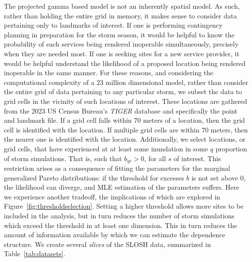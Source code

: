 The projected gamma based model is not an inherently spatial model.  
    As such, rather than holding the entire grid in memory, it makes sense to consider 
    data pertaining only to landmarks of interest.    If one is performing 
    contingency planning in preparation for the storm season, it would be 
    helpful to know the probability of such services being rendered inoperable 
    simultaneously, precisely when they are needed most.  If one is seeking 
    sites for a new service provider, it would be helpful understand the 
    likelihood of a proposed location being rendered inoperable in the same 
    manner.  For these reasons, and considering the computational complexity of 
    a 23 million dimensional model, rather than consider the entire grid of data 
    pertaining to any particular storm, we subset the data to grid cells in the 
    vicinity of such locations of interest.  These locations are gathered from 
    the 2023 US Census Bureau's \emph{TIGER} database \needcite and specifically 
    the point and landmark file.  If a grid cell falls within 70 meters of a location,
    then the grid cell is identified with the location.  If multiple grid cells
    are within 70 meters, then the nearer one is identified with the location.
    Additionally, we select locations, or grid cells, that have experienced at
    at least some inundation in some $q$ proportion of storm simulations.  That is,
    such that $b_{qs} > 0$, for all $s$ of interest.  This restriction arises
    as a consequence of fitting the parameters for the marginal generalized Pareto
    distributions: if the threshold for excesses $b$ is not set above $0$, the 
    likelihood can diverge, and MLE estimation of the parameters suffers. Here 
    we experience another tradeoff, the implications of which are explored in 
    Figure~\ref{fig:thresholdselection}.  Setting a higher threshold allows more 
    sites to be included in the analysis, but in turn reduces the number of storm 
    simulations which exceed the threshold in at least one dimension.  This in turn 
    reduces the amount of information available by which we can estimate the 
    dependence structure.  We create several \emph{slices} of the SLOSH data,
    summarized in Table~\ref{tab:datasets}.

